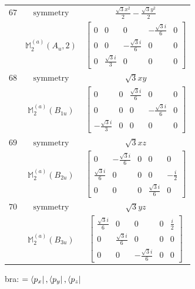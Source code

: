 \documentclass[fleqn,8pt,landscape]{jsarticle}
\begin{document}
\begin{longtable}{ccc}
$ 67 $ & $ \text{symmetry} $ & $ \frac{\sqrt{3} x^{2}}{2} - \frac{\sqrt{3} y^{2}}{2} $ \\
$  $ & $ \mathbb{M}_{2}^{(a)}(A_{u},2) $ & $ \begin{bmatrix} 0 & 0 & 0 & - \frac{\sqrt{3} i}{6} & 0 \\ 0 & 0 & - \frac{\sqrt{3} i}{6} & 0 & 0 \\ 0 & \frac{\sqrt{3} i}{3} & 0 & 0 & 0 \end{bmatrix} $ \\ \hline
$ 68 $ & $ \text{symmetry} $ & $ \sqrt{3} x y $ \\
$  $ & $ \mathbb{M}_{2}^{(a)}(B_{1u}) $ & $ \begin{bmatrix} 0 & 0 & \frac{\sqrt{3} i}{6} & 0 & 0 \\ 0 & 0 & 0 & - \frac{\sqrt{3} i}{6} & 0 \\ - \frac{\sqrt{3} i}{3} & 0 & 0 & 0 & 0 \end{bmatrix} $ \\ \hline
$ 69 $ & $ \text{symmetry} $ & $ \sqrt{3} x z $ \\
$  $ & $ \mathbb{M}_{2}^{(a)}(B_{2u}) $ & $ \begin{bmatrix} 0 & - \frac{\sqrt{3} i}{6} & 0 & 0 & 0 \\ \frac{\sqrt{3} i}{6} & 0 & 0 & 0 & - \frac{i}{2} \\ 0 & 0 & 0 & \frac{\sqrt{3} i}{6} & 0 \end{bmatrix} $ \\ \hline
$ 70 $ & $ \text{symmetry} $ & $ \sqrt{3} y z $ \\
$  $ & $ \mathbb{M}_{2}^{(a)}(B_{3u}) $ & $ \begin{bmatrix} \frac{\sqrt{3} i}{6} & 0 & 0 & 0 & \frac{i}{2} \\ 0 & \frac{\sqrt{3} i}{6} & 0 & 0 & 0 \\ 0 & 0 & - \frac{\sqrt{3} i}{6} & 0 & 0 \end{bmatrix} $ \\ \hline
\end{longtable}
bra: $=\bra{p_{x}}, \bra{p_{y}}, \bra{p_{z}}$
\end{document}
